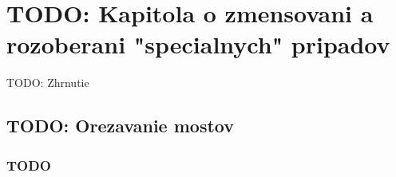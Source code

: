 \chapter{TODO: Kapitola o zmensovani a rozoberani "specialnych" pripadov}

TODO: Zhrnutie

\section{TODO: Orezavanie mostov}

\subsection{TODO}

